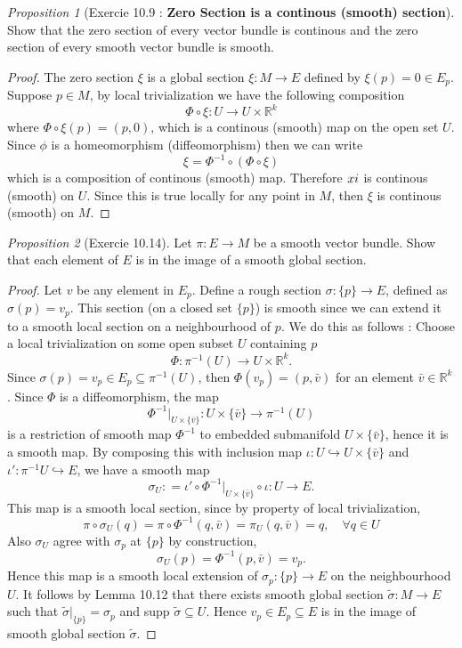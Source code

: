 \documentclass[a4paper]{article}
\theoremstyle{remark}
\newtheorem{prop}{Proposition}
\newcommand{\rk}{\mathbb{R}^k} %
\newcommand{\subhim}{\subseteq} %
\begin{document}
\begin{prop}[Exercie 10.9 : \textbf{Zero Section is a continous (smooth) section}]
Show that the zero section of every vector bundle is continous and the zero section of every smooth vector bundle is smooth.
\end{prop}
\begin{proof}
The zero section $\xi$ is a global section  $\xi : M \to E$ defined by $\xi(p) = 0 \in E_p$. Suppose $p \in M$, by local trivialization we have the following composition 
$$
\Phi \circ \xi : U \to U \times \rk
$$
where $\Phi \circ \xi (p) = (p,0)$, which is a continous (smooth) map on the open set $U$. Since $\phi$ is a homeomorphism (diffeomorphism) then we can write
$$
\xi = \Phi^{-1} \circ (\Phi \circ \xi) 
$$  
which is a composition of continous (smooth) map. Therefore $\\xi$ is continous (smooth) on $U$. Since this is true locally for any point in $M$, then $\xi$ is continous (smooth) on $M$.
\end{proof}

\begin{prop}[Exercie 10.14]
Let $\pi : E \to M$ be a smooth vector bundle. Show that each element of $E$ is in the image of a smooth global section.
\end{prop}
\begin{proof}
Let $v$ be any element in $E_p$. Define a rough section $\sigma : \{p\} \to E$, defined as $\sigma(p) = v_p$. This section (on a closed set $\{p\}$) is smooth since we can extend it to a smooth local section on a neighbourhood of $p$. We do this as follows : Choose a local trivialization on some open subset $U$ containing $p$
$$
\Phi : \pi^{-1}(U) \to U \times \rk.
$$
Since $\sigma(p) = v_p \in E_p \subhim \pi^{-1}(U)$, then $\Phi (v_p) = (p,\bar{v})$ for an element $\bar{v} \in \rk$. Since $\Phi$ is a diffeomorphism, the map
$$
\Phi^{-1}|_{U\times \{\bar{v}\}} : U\times \{\bar{v}\} \to \pi^{-1}(U)
$$
is a restriction of smooth map $\Phi^{-1}$ to embedded submanifold $U \times \{\bar{v}\}$, hence it is a smooth map. By composing this with inclusion map $\iota : U \hookrightarrow U \times \{\bar{v}\}$ and $\iota' : \pi^{-1}U \hookrightarrow E$, we have a smooth map
$$
\sigma_U : =  \iota' \circ \Phi^{-1}|_{U\times \{\bar{v}\}} \circ \iota : U \to  E.
$$
This map is a smooth local section, since by property of local trivialization,
$$
\pi \circ \sigma_U(q) = \pi \circ \Phi^{-1} (q,\bar{v}) = \pi_U (q,\bar{v}) = q, \quad \forall q \in U
$$
Also $\sigma_U$ agree with $\sigma_p$ at $\{p\}$ by construction,
$$
\sigma_U(p) = \Phi^{-1} (p,\bar{v}) = v_p.
$$
Hence this map is a smooth local extension of $\sigma_p :\{p\} \to E$ on the neighbourhood $U$. It follows by Lemma 10.12 that there exists smooth global section $\widetilde{\sigma} : M \to E$ such that $\widetilde{\sigma}|_{\{p\}} = \sigma_p$ and supp $\widetilde{\sigma} \subhim U$. Hence $v_p \in E_p \subhim E$ is in the image of smooth global section $\widetilde{\sigma}$.
\end{proof}
\end{document}

